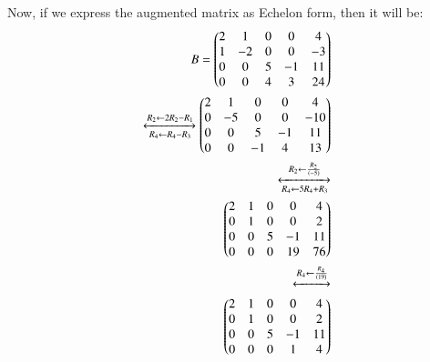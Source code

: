 Now, if we express the augmented matrix as Echelon form, then it will be:\\

\begin{equation}
\begin{aligned}
    B=  \begin{pmatrix}
      2       & 1    & 0   & 0  & 4\\ 
      1       & -2   & 0   & 0  & -3\\
      0       & 0    & 5   & -1  & 11\\ 
      0       & 0   & 4   & 3   & 24\\
            
    \end{pmatrix}\\
    \xleftrightarrow
    [R_4\leftarrow R_4 - R_3]{R_2\leftarrow 2R_2 - R_1} 
    \begin{pmatrix}
      2       & 1    & 0   & 0  & 4\\ 
      0       & -5   & 0   & 0  & -10\\
      0       & 0    & 5   & -1  & 11\\ 
      0       & 0   & -1   & 4   & 13\\
            
    \end{pmatrix}\\
    \xleftrightarrow
    [R_4\leftarrow 5R_4 + R_3]{R_2\leftarrow \frac{R_2}{(-5)}}\\
    \begin{pmatrix}
      2       & 1    & 0   & 0  & 4\\ 
      0       & 1   & 0   & 0  & 2\\
      0       & 0    & 5   & -1  & 11\\ 
      0       & 0   & 0   & 19   & 76\\
            
    \end{pmatrix}\\
    \xleftrightarrow
    []{R_4\leftarrow \frac{R_4}{(19)}}\\
    \begin{pmatrix}
      2       & 1    & 0   & 0  & 4\\ 
      0       & 1   & 0   & 0  & 2\\
      0       & 0    & 5   & -1  & 11\\ 
      0       & 0   & 0   & 1   & 4\\
            
    \end{pmatrix}
\end{aligned}
\end{equation}

